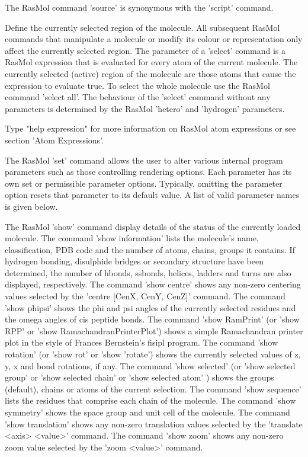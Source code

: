 The RasMol command
'source'
is synonymous with the
'script'
command.

Define the currently selected region of the molecule. All subsequent RasMol
commands that manipulate a molecule or modify its colour or representation
only affect the currently selected region. The parameter of a
'select'
command is a RasMol expression that is evaluated for every atom of the
current molecule. The currently selected (active) region of the molecule
are those atoms that cause the expression to evaluate true. To select
the whole molecule use the RasMol command
'select all'.
The behaviour of the
'select'
command without any parameters is determined by the RasMol
'hetero'
and
'hydrogen'
parameters.

Type "help expression" for more information on RasMol atom expressions or
see section
'Atom Expressions'.

The RasMol
'set'
command allows the user to alter various internal program parameters
such as those controlling rendering options. Each parameter has its
own set or permissible parameter options. Typically, omitting the
parameter option resets that parameter to its default value. A list of
valid parameter names is given below.

The RasMol
'show'
command display details of the status of the currently
loaded molecule. The command
'show information'
lists the molecule's name,
classification, PDB code and the number of atoms, chains, groups it contains.
If hydrogen bonding, disulphide bridges or secondary structure have been
determined, the number of hbonds, ssbonds, helices, ladders and turns
are also displayed, respectively. The command
'show centre'
shows any non-zero centering values selected by the
'centre [CenX, CenY, CenZ]'
command. The command
'show phipsi'
shows the phi and psi angles of the currently selected residues and
the omega angles of cis peptide bonds. The command
'show RamPrint'
(or 'show RPP' or 'show RamachandranPrinterPlot') shows a simple
Ramachandran printer plot in the style of Frances Bernstein's fisipl
program.  The command
'show rotation'
(or 'show rot' or 'show 'rotate') shows the currently selected values
of z, y, x and bond rotations, if any.
The command
'show selected'
(or 'show selected group' or 'show selected chain' or  'show selected atom' )
shows the groups (default), chains or atoms of the current selection.
The command
'show sequence'
lists the residues that comprise each chain of the molecule.  The command
'show symmetry'
shows the space group and unit cell of the molecule. The command
'show translation'
shows any non-zero translation values selected by the
'translate <axis> <value>'
command. The command
'show zoom'
shows any non-zero zoom value selected by the
'zoom <value>'
command.

